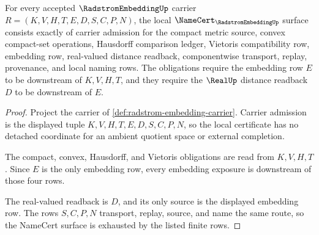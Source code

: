 \begin{theorem}\label{thm:radstrom-embedding-namecert-obligations}
For every accepted $\RadstromEmbeddingUp$ carrier $R=(K,V,H,T,E,D,S,C,P,N)$, the local $\NameCert_{\RadstromEmbeddingUp}$ surface consists exactly of carrier admission for the compact metric source, convex compact-set operations, Hausdorff comparison ledger, Vietoris compatibility row, embedding row, real-valued distance readback, componentwise transport, replay, provenance, and local naming rows. The obligations require the embedding row $E$ to be downstream of $K,V,H,T$, and they require the $\RealUp$ distance readback $D$ to be downstream of $E$.
\end{theorem}
\begin{proof}
Project the carrier of \autoref{def:radstrom-embedding-carrier}. Carrier admission is the displayed tuple $K,V,H,T,E,D,S,C,P,N$, so the local certificate has no detached coordinate for an ambient quotient space or external completion.

The compact, convex, Hausdorff, and Vietoris obligations are read from $K,V,H,T$. Since $E$ is the only embedding row, every embedding exposure is downstream of those four rows.

The real-valued readback is $D$, and its only source is the displayed embedding row. The rows $S,C,P,N$ transport, replay, source, and name the same route, so the NameCert surface is exhausted by the listed finite rows.
\end{proof}

